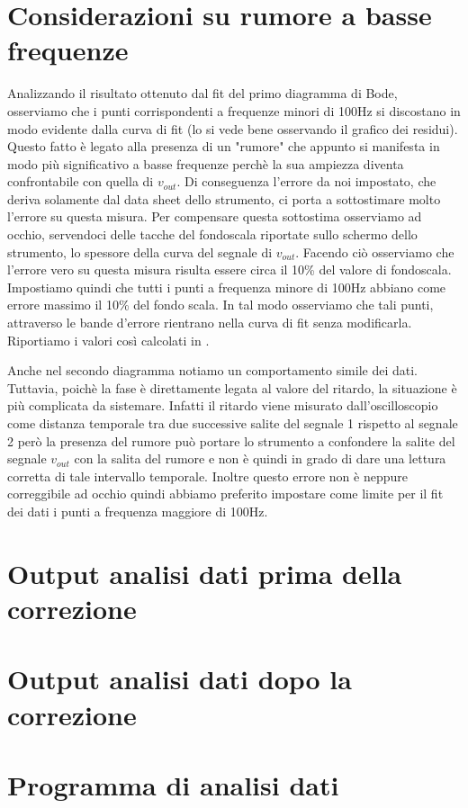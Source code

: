 \documentclass[
    rmp,
    reprint, 
    superscriptaddress, 
    altaffilletter, 
    amsmath, 
    amssymb, 
    a4paper]{revtex4-2}
\begin{document}
\section{Considerazioni su rumore a basse frequenze}
\label{sec:correction}

Analizzando il risultato ottenuto dal fit del primo diagramma di Bode, osserviamo che i punti corrispondenti a frequenze minori di 100Hz si discostano in modo evidente dalla curva di fit (lo si vede bene osservando il grafico dei residui). Questo fatto è legato alla presenza di un "rumore" che appunto si manifesta in modo più significativo a basse frequenze perchè la sua ampiezza diventa confrontabile con quella di $v_{out}$. Di conseguenza l'errore da noi impostato, che deriva solamente dal data sheet dello strumento, ci porta a sottostimare molto l'errore su questa misura. Per compensare questa sottostima osserviamo ad occhio, servendoci delle tacche del fondoscala riportate sullo schermo dello strumento, lo spessore della curva del segnale di $v_{out}$. Facendo ciò osserviamo che l'errore vero su questa misura risulta essere circa il 10\% del valore di fondoscala. Impostiamo quindi che tutti i punti a frequenza minore di 100Hz abbiano come errore massimo il 10\% del fondo scala. In tal modo osserviamo che tali punti, attraverso le bande d'errore rientrano nella curva di fit senza modificarla. Riportiamo i valori così calcolati in .

Anche nel secondo diagramma notiamo un comportamento simile dei dati. Tuttavia, poichè la fase è direttamente legata al valore del ritardo, la situazione è più complicata da sistemare. Infatti il ritardo viene misurato dall'oscilloscopio come distanza temporale tra due successive salite del segnale 1 rispetto al segnale 2 però la presenza del rumore può portare lo strumento a confondere la salite del segnale $v_{out}$ con la salita del rumore e non è quindi in grado di dare una lettura corretta di tale intervallo temporale. Inoltre questo errore non è neppure correggibile ad occhio quindi abbiamo preferito impostare come limite per il fit dei dati i punti a frequenza maggiore di 100Hz.


\appendix

\setcounter{table}{0}
\renewcommand{\thetable}{A-\Roman{table}}
\newpage
\section{Output analisi dati prima della correzione}
\label{appendix:output}

\section{Output analisi dati dopo la correzione}
\label{appendix:out_correct}


\onecolumngrid
\section{Programma di analisi dati}

\end{document}

